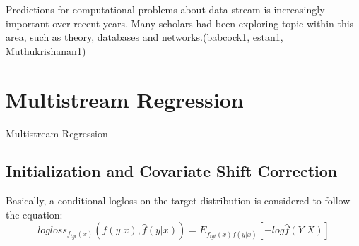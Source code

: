 
Predictions for computational problems about data stream is 
increasingly
important over recent years. Many scholars had been exploring 
topic within
this area, such as theory, databases and networks.(babcock1, 
estan1,
Muthukrishanan1)

\section{Multistream Regression}

\makeatletter
\def\BState{\State\hskip-\ALG@thistlm}
\makeatother

\begin{algorithm}
\caption{Multistream Regression}\label{driftdetection}
\end{algorithm}

\subsection{Initialization and Covariate Shift Correction}
Basically, a conditional logloss on the target distribution is considered to follow the equation:
\begin{equation*}
	logloss_{f_{tgt}(x)}(f(y|x), \hat{f}(y|x)) = E_{f_{tgt}(x)f(y|x)}[-log\hat{f}(Y|X)] %
\end{equation*}

